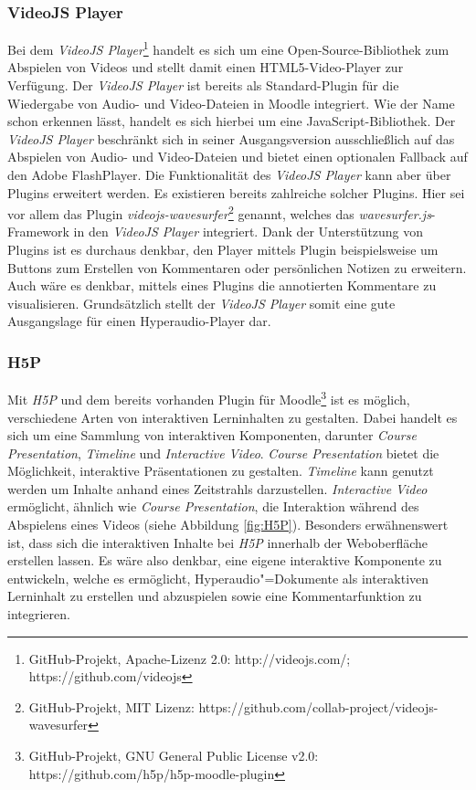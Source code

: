 \subsubsection{VideoJS Player}
Bei dem \textit{VideoJS Player}\footnote{GitHub-Projekt, Apache-Lizenz 2.0: http://videojs.com/; https://github.com/videojs} handelt es sich um eine Open-Source-Bibliothek zum Abspielen von Videos und stellt damit einen HTML5-Video-Player zur Verfügung. Der \textit{VideoJS Player} ist bereits als Standard-Plugin für die Wiedergabe von Audio- und Video-Dateien in Moodle integriert. Wie der Name schon erkennen lässt, handelt es sich hierbei um eine JavaScript-Bibliothek. Der \textit{VideoJS Player} beschränkt sich in seiner Ausgangsversion ausschließlich auf das Abspielen von Audio- und Video-Dateien und bietet einen optionalen Fallback auf den Adobe FlashPlayer. Die Funktionalität des \textit{VideoJS Player} kann aber über Plugins erweitert werden. Es existieren bereits zahlreiche solcher Plugins. Hier sei vor allem das Plugin \textit{videojs-wavesurfer}\footnote{GitHub-Projekt, MIT Lizenz: https://github.com/collab-project/videojs-wavesurfer} genannt, welches das \textit{wavesurfer.js}-Framework in den \textit{VideoJS Player} integriert. Dank der Unterstützung von Plugins ist es durchaus denkbar, den Player mittels Plugin beispielsweise um Buttons zum Erstellen von Kommentaren oder persönlichen Notizen zu erweitern. Auch wäre es denkbar, mittels eines Plugins die annotierten Kommentare zu visualisieren. Grundsätzlich stellt der \textit{VideoJS Player} somit eine gute Ausgangslage für einen Hyperaudio-Player dar.

\subsubsection{H5P}
Mit \textit{H5P} und dem bereits vorhanden Plugin für Moodle\footnote{GitHub-Projekt, GNU General Public License v2.0: https://github.com/h5p/h5p-moodle-plugin} ist es möglich, verschiedene Arten von interaktiven Lerninhalten zu gestalten. Dabei handelt es sich um eine Sammlung von interaktiven Komponenten, darunter \textit{Course Presentation}, \textit{Timeline} und \textit{Interactive Video}. \textit{Course Presentation} bietet die Möglichkeit, interaktive Präsentationen zu gestalten. \textit{Timeline} kann genutzt werden um Inhalte anhand eines Zeitstrahls darzustellen. \textit{Interactive Video} ermöglicht, ähnlich wie \textit{Course Presentation}, die Interaktion während des Abspielens eines Videos (siehe Abbildung \ref{fig:H5P}). Besonders erwähnenswert ist, dass sich die interaktiven Inhalte bei \textit{H5P} innerhalb der Weboberfläche erstellen lassen. Es wäre also denkbar, eine eigene interaktive Komponente zu entwickeln, welche es ermöglicht, Hyperaudio"=Dokumente als interaktiven Lerninhalt zu erstellen und abzuspielen sowie eine Kommentarfunktion zu integrieren.

